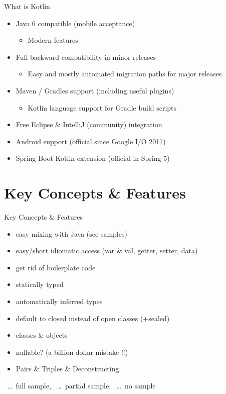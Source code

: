 \begin{frame}{What is Kotlin}
	\begin{itemize}
		\item Java 6 compatible (mobile acceptance)
		\begin{itemize}
			\item Modern features 
		\end{itemize}
		\item Full backward compatibility in minor releases
		\begin{itemize}
			\item Easy and mostly automated migration paths for major releases 
		\end{itemize}
		\item Maven / Gradles support (including useful plugins)
		\begin{itemize}
			\item Kotlin language support for Gradle build scripts
		\end{itemize}
		\item Free Eclipse \& IntelliJ (community) integration
		\item Android support (official since Google I/O 2017)
		\item Spring Boot Kotlin extension (official in Spring 5)
	\end{itemize}
\end{frame}

\section{Key Concepts \& Features}

\begin{frame}{Key Concepts \& Features}
	\begin{itemize}
		\item easy mixing with Java (see samples) \cmark
		\item easy/short idiomatic access (var \& val, getter, setter, data) \cmark
		\item get rid of boilerplate code \cmark
		\item statically typed \cmark
		\item automatically inferred types \cmark
		\item default to closed instead of open classes (+sealed) \tmark
		\item classes \& objects \tmark
		\item nullable? (a billion dollar mistake !!) \cmark
		\item Pairs \& Triples \& Deconstructing \cmark
	\end{itemize}
\cmark\ \dots\ full sample, \tmark\ \dots\ partial sample, \xmark\ \dots\ no sample
\end{frame}


